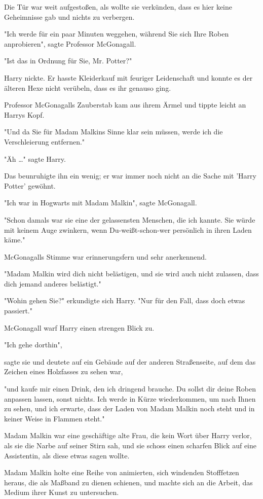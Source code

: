 {Die Tür war weit aufgestoßen, als wollte sie verkünden, dass es hier keine Geheimnisse gab und nichts zu verbergen.

"Ich werde für ein paar Minuten weggehen, während Sie sich Ihre Roben anprobieren", sagte Professor McGonagall.

"Ist das in Ordnung für Sie, Mr. Potter?"

Harry nickte. Er hasste Kleiderkauf mit feuriger Leidenschaft und konnte es der älteren Hexe nicht verübeln, dass es ihr genauso ging.

Professor McGonagalls Zauberstab kam aus ihrem Ärmel und tippte leicht an Harrys Kopf.

"Und da Sie für Madam Malkins Sinne klar sein müssen, werde ich die Verschleierung entfernen."

"Äh …" sagte Harry.

Das beunruhigte ihn ein wenig; er war immer noch nicht an die Sache mit 'Harry Potter' gewöhnt.

"Ich war in Hogwarts mit Madam Malkin", sagte McGonagall.

"Schon damals war sie eine der gelassensten Menschen, die ich kannte. Sie würde mit keinem Auge zwinkern, wenn Du-weißt-schon-wer persönlich in ihren Laden käme."

McGonagalls Stimme war erinnerungsfern und sehr anerkennend.

"Madam Malkin wird dich nicht belästigen, und sie wird auch nicht zulassen, dass dich jemand anderes belästigt."

"Wohin gehen Sie?" erkundigte sich Harry. "Nur für den Fall, dass doch etwas passiert."

McGonagall warf Harry einen strengen Blick zu.

"Ich gehe dorthin",

sagte sie und deutete auf ein Gebäude auf der anderen Straßenseite, auf dem das Zeichen eines Holzfasses zu sehen war,

"und kaufe mir einen Drink, den ich dringend brauche. Du sollst dir deine Roben anpassen lassen, sonst nichts. Ich werde in Kürze wiederkommen, um nach Ihnen zu sehen, und ich erwarte, dass der Laden von Madam Malkin noch steht und in keiner Weise in Flammen steht."

Madam Malkin war eine geschäftige alte Frau, die kein Wort über Harry verlor, als sie die Narbe auf seiner Stirn sah, und sie schoss einen scharfen Blick auf eine Assistentin, als diese etwas sagen wollte.

Madam Malkin holte eine Reihe von animierten, sich windenden Stofffetzen heraus, die als Maßband zu dienen schienen, und machte sich an die Arbeit, das Medium ihrer Kunst zu untersuchen.

}
